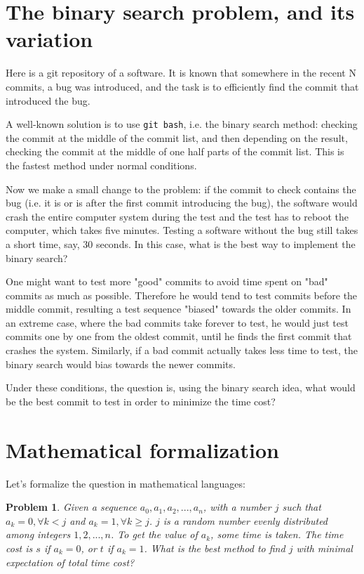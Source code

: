 \documentclass[]{article}
\begin{document}
\newtheorem{problem}{Problem}
\newtheorem{lemma}{Lemma}

\section{The binary search problem, and its variation}

Here is a git repository of a software. It is known that somewhere in the recent N commits, a bug was introduced, and the task is to efficiently find the commit that introduced the bug.

A well-known solution is to use \texttt{git bash}, i.e. the binary search method: checking the commit at the middle of the commit list, and then depending on the result, checking the commit at the middle of one half parts of the commit list. This is the fastest method under normal conditions.

Now we make a small change to the problem: if the commit to check contains the bug (i.e. it is or is after the first commit introducing the bug), the software would crash the entire computer system during the test and the test has to reboot the computer, which takes five minutes. Testing a software without the bug still takes a short time, say, 30 seconds. In this case, what is the best way to implement the binary search?

One might want to test more "good" commits to avoid time spent on "bad" commits as much as possible. Therefore he would tend to test commits before the middle commit, resulting a test sequence "biased" towards the older commits. In an extreme case, where the bad commits take forever to test, he would just test commits one by one from the oldest commit, until he finds the first commit that crashes the system. Similarly, if a bad commit actually takes less time to test, the binary search would bias towards the newer commits.

Under these conditions, the question is, using the binary search idea, what would be the best commit to test in order to minimize the time cost?

\section{Mathematical formalization}

Let's formalize the question in mathematical languages:

\begin{problem}
	Given a sequence $a_0, a_1, a_2, ..., a_n$, with a number $j$ such that $a_k = 0, \forall k < j$ and $a_k = 1, \forall k \ge j$. $j$ is a random number evenly distributed among integers $1, 2, ..., n$. To get the value of $a_k$, some time is taken. The time cost is $s$ if $a_k = 0$, or $t$ if $a_k = 1$. What is the best method to find $j$ with minimal expectation of total time cost?
\end{problem}
\end{document}
